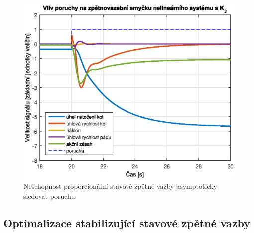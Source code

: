 \documentclass[conference]{IEEEtran}
\begin{document}
\begin{figure}[h!]
    \centerline{\includegraphics[width=\linewidth]{stavova_ZV_porucha.eps}}
    \caption{Neschopnost proporcionální stavové zpětné vazby asymptoticky sledovat poruchu}
    \label{fig:porucha_stavova_ZV}        
\end{figure}

\subsection{Optimalizace stabilizující stavové zpětné vazby}
\end{document}

